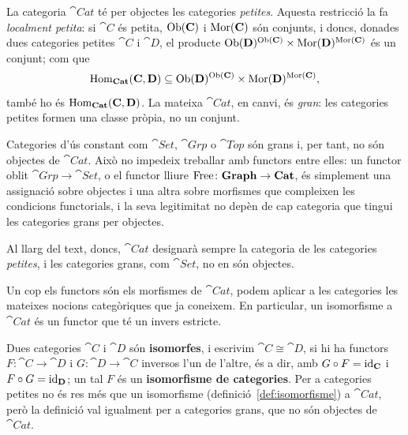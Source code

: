 \begin{observacio}\label{obs:mida-cat}
La categoria $\cat{Cat}$ té per objectes les categories \emph{petites}. Aquesta restricció la fa \emph{localment petita}: si $\cat{C}$ és petita, $\operatorname{Ob}(\mathbf{C})$ i $\operatorname{Mor}(\mathbf{C})$ són conjunts, i doncs, donades dues categories petites $\cat{C}$ i $\cat{D}$, el producte $\operatorname{Ob}(\mathbf{D})^{\operatorname{Ob}(\mathbf{C})}\times \operatorname{Mor}(\mathbf{D})^{\operatorname{Mor}(\mathbf{C})}$ és un conjunt; com que
\[
\operatorname{Hom}_{\mathbf{Cat}}(\mathbf{C},\mathbf{D})\subseteq \operatorname{Ob}(\mathbf{D})^{\operatorname{Ob}(\mathbf{C})}\times \operatorname{Mor}(\mathbf{D})^{\operatorname{Mor}(\mathbf{C})},
\]
també ho és $\operatorname{Hom}_{\mathbf{Cat}}(\mathbf{C},\mathbf{D})$. La mateixa $\cat{Cat}$, en canvi, és \emph{gran}: les categories petites formen una classe pròpia, no un conjunt.

Categories d'ús constant com $\cat{Set}$, $\cat{Grp}$ o $\cat{Top}$ són grans i, per tant, no són objectes de $\cat{Cat}$. Això no impedeix treballar amb functors entre elles: un functor oblit $\cat{Grp}\to\cat{Set}$, o el functor lliure $\operatorname{Free}\colon\mathbf{Graph}\to\mathbf{Cat}$, és simplement una assignació sobre objectes i una altra sobre morfismes que compleixen les condicions functorials, i la seva legitimitat no depèn de cap categoria que tingui les categories grans per objectes.

Al llarg del text, doncs, $\cat{Cat}$ designarà sempre la categoria de les categories \emph{petites}, i les categories grans, com $\cat{Set}$, no en són objectes.\footnotemark
\end{observacio}
%

Un cop els functors són els morfismes de $\cat{Cat}$, podem aplicar a les categories les mateixes nocions categòriques que ja coneixem. En particular, un isomorfisme a $\cat{Cat}$ és un functor que té un invers estricte.

\begin{definicio}\label{def:iso-categories}
Dues categories $\cat{C}$ i $\cat{D}$ són \textbf{isomorfes}, i escrivim $\cat{C}\cong\cat{D}$, si hi ha functors $F\colon\cat{C}\to\cat{D}$ i $G\colon\cat{D}\to\cat{C}$ inversos l'un de l'altre, és a dir, amb $G\circ F=\operatorname{id}_{\mathbf{C}}$ i $F\circ G=\operatorname{id}_{\mathbf{D}}$; un tal $F$ és un \textbf{isomorfisme de categories}. Per a categories petites no és res més que un isomorfisme (definició~\ref{def:isomorfisme}) a $\cat{Cat}$, però la definició val igualment per a categories grans, que no són objectes de $\cat{Cat}$.
\end{definicio}

